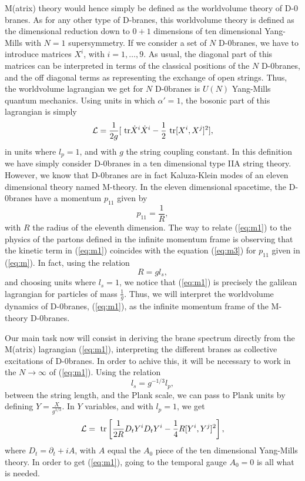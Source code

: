 M(atrix) theory would hence simply be defined as the worldvolume theory of D-$0$branes. 
As for any other type of D-branes, this worldvolume theory is defined 
as the dimensional reduction down to $0+1$ dimensions of ten 
dimensional Yang-Mills with $N=1$ supersymmetry. If we consider a set 
of $N$ D-$0$branes, we have to introduce matrices $X^{i}$, with 
$i=1,\ldots,9$. As usual, the diagonal part of this matrices can be interpreted 
in terms of the classical positions of the $N$ D-$0$branes, and the off 
diagonal terms as representing the exchange of open strings. Thus, the 
worldvolume lagrangian we get for $N$ D-$0$branes is $U(N)$ Yang-Mills 
quantum mechanics. Using units in which $\alpha'=1$, the bosonic part of 
this lagrangian is simply
\begin{equation}
{\cal L} = \frac {1}{2 g} [ \hbox { tr} \dot{X}^{i} \dot{X}^{i} - 
\frac {1}{2} \hbox { tr} [X^{i},X^{j}]^2 ],
\label{eq:m1}
\end{equation}
in units where $l_p=1$, and with $g$ the string coupling
constant. In this definition we have simply consider D-$0$branes in a ten dimensional 
type IIA string theory. However, we know that D-$0$branes are in fact Kaluza-Klein 
modes of an eleven dimensional theory named M-theory. In the eleven dimensional 
spacetime, the D-$0$branes have a momentum $p_{11}$ given by
\begin{equation}
p_{11} = \frac {1}{R},
\label{eq:m}
\end{equation}
with $R$ the radius of the eleventh dimension. The way to relate (\ref{eq:m1}) 
to the physics of the partons defined in the infinite momentum
frame is observing that the kinetic term in (\ref{eq:m1})
coincides with the equation (\ref{eq:m3}) for $p_{11}$ given in
(\ref{eq:m}). In fact, using  the relation 
\begin{equation}
R= g l_s,
\label{eq:m4}
\end{equation}
and choosing units where $l_s=1$, we notice that (\ref{eq:m1}) is precisely 
the galilean lagrangian for particles of mass $\frac {1}{g}$. Thus, we will 
interpret the worldvolume dynamics of D-$0$branes, (\ref{eq:m1}), as the 
infinite momentum frame of the M-theory D-$0$branes.
 
Our main task now will consist in deriving the brane spectrum 
directly from the M(atrix) lagrangian (\ref{eq:m1}), interpreting the different branes as collective excitations of D-$0$branes. In 
order to achive this, it will be necessary to work in the $N \rightarrow 
\infty$ of (\ref{eq:m1}). Using the relation 
\begin{equation}
l_s=g^{-1/3}l_p,
\end{equation}
between the string length, and the Plank scale, we can pass to
Plank units by defining $Y=\frac {X}{g^{1/3}}$. In $Y$ variables, 
and with $l_p=1$, we get
\begin{equation}
{\cal L} = \hbox { tr} \left[ \frac {1}{2R} D_t Y^{i} D_t Y^{i} - \frac 
{1}{4} R [Y^{i},Y^{j}]^2 \right],
\label{eq:m5}
\end{equation}
where $D_t = \partial_t +i A$, with $A$ equal the $A_0$ piece of the ten 
dimensional Yang-Mills theory. In order to get (\ref{eq:m1}), going to 
the temporal gauge $A_0=0$ is all what is needed.
  
